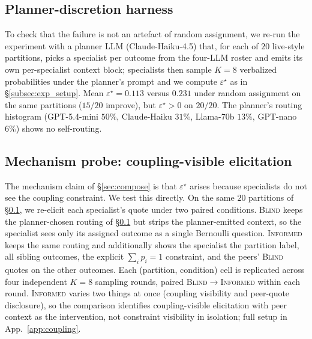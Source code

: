 \documentclass{article}
\theoremstyle{plain}
\theoremstyle{definition}
\theoremstyle{remark}
\newcommand{\eps}{\varepsilon}
\begin{document}
\subsection{Planner-discretion harness}
\label{subsec:planner_disc}

To check that the failure is not an artefact of random assignment,
we re-run the experiment with a planner LLM (Claude-Haiku-4.5)
that, for each of $20$ live-style partitions, picks a specialist
per outcome from the four-LLM roster and emits its own
per-specialist context block; specialists then sample $K{=}8$
verbalized probabilities under the planner's prompt and we compute
$\eps^\star$ as in \S\ref{subsec:exp_setup}. Mean $\eps^\star =
0.113$ versus $0.231$ under random assignment on the same
partitions ($15/20$ improve), but $\eps^\star\!>\!0$ on $20/20$.
The planner's routing histogram (GPT-5.4-mini $50\%$, Claude-Haiku
$31\%$, Llama-70b $13\%$, GPT-nano $6\%$) shows no self-routing.

\subsection{Mechanism probe: coupling-visible elicitation}
\label{subsec:coupling}

The mechanism claim of \S\ref{sec:compose} is that $\eps^\star$
arises because specialists do not see the coupling constraint.
We test this directly. On the same $20$ partitions of
\S\ref{subsec:planner_disc}, we re-elicit each specialist's quote
under two paired conditions. \textsc{Blind} keeps the
planner-chosen routing of \S\ref{subsec:planner_disc} but strips
the planner-emitted context, so the specialist sees only its
assigned outcome as a single Bernoulli question. \textsc{Informed}
keeps the same routing and additionally shows the specialist the
partition label, all sibling outcomes, the explicit
$\sum_i p_i\!=\!1$ constraint, and the peers' \textsc{Blind} quotes
on the other outcomes. Each (partition, condition) cell is
replicated across four independent $K\!=\!8$ sampling rounds,
paired \textsc{Blind}$\to$\textsc{Informed} within each round.
\textsc{Informed} varies two things at once (coupling visibility
and peer-quote disclosure), so the comparison identifies
coupling-visible elicitation with peer context as the intervention,
not constraint visibility in isolation; full setup in
App.~\ref{app:coupling}.

\begin{table}[h]
\centering
\small

\caption{\textbf{Coupling-visibility intervention on the
20 highest-$\eps^\star$ partitions} of the planner harness
(\S\ref{subsec:planner_disc}). $\Delta = \eps^\star_{\textsc{Blind}} - \eps^\star_{\textsc{Informed}}$; the
paired-bootstrap CI excludes zero and the Wilcoxon signed-rank
test rejects at $p\!=\!2.6\!\times\!10^{-10}$.}
\label{tab:coupling}
\end{table}
\end{document}
